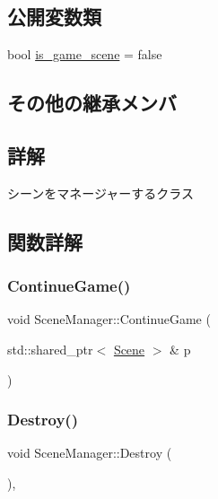 \subsection*{公開変数類}
\begin{DoxyCompactItemize}
\item 
bool \mbox{\hyperlink{class_scene_manager_a416645f4b11ce8cdb81d9d43d1c5666b}{is\+\_\+game\+\_\+scene}} = false
\end{DoxyCompactItemize}
\subsection*{その他の継承メンバ}


\subsection{詳解}
シーンをマネージャーするクラス 

\subsection{関数詳解}
\mbox{\label{class_scene_manager_a5ed223ec14c6b62d378b3f95ed4f5d8e}} 
\subsubsection{\texorpdfstring{Continue\+Game()}{ContinueGame()}}
{\footnotesize\ttfamily void Scene\+Manager\+::\+Continue\+Game (\begin{DoxyParamCaption}\item[{std\+::shared\+\_\+ptr$<$ \mbox{\hyperlink{class_scene}{Scene}} $>$ \&}]{p }\end{DoxyParamCaption})\hspace{0.3cm}{\ttfamily [inline]}}

\mbox{\label{class_scene_manager_a0e3ad11342e763f0d4108c0b4674a157}} 
\subsubsection{\texorpdfstring{Destroy()}{Destroy()}}
{\footnotesize\ttfamily void Scene\+Manager\+::\+Destroy (\begin{DoxyParamCaption}{ }\end{DoxyParamCaption})\hspace{0.3cm}{\ttfamily [final]}, {\ttfamily [virtual]}}



